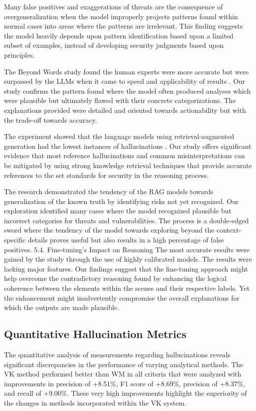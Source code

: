 \documentclass[sigconf]{acmart}
\begin{document}
Many false positives and exaggerations of threats are the consequence of overgeneralization when the model improperly projects patterns found within normal cases into areas where the patterns are irrelevant. This finding suggests the model heavily depends upon pattern identification based upon a limited subset of examples, instead of developing security judgments based upon principles.

The Beyond Words study found the human experts were more accurate but were surpassed by the LLMs when it came to speed and applicability of results \citep{esposito2024beyond}. Our study confirms the pattern found where the model often produced analyses which were plausible but ultimately flawed with their concrete categorizations. The explanations provided were detailed and oriented towards actionability but with the trade-off towards accuracy.

The experiment showed that the language models using retrieval-augmented generation had the lowest instances of hallucinations \citep{esposito2024beyond}. Our study offers significant evidence that most reference hallucinations and common misinterpretations can be mitigated by using strong knowledge retrieval techniques that provide accurate references to the set standards for security in the reasoning process.

The research demonstrated the tendency of the RAG models towards generalization of the known truth by identifying risks not yet recognized. Our exploration identified many cases where the model recognized plausible but incorrect categories for threats and vulnerabilities. The process is a double-edged sword where the tendency of the model towards exploring beyond the context-specific details proves useful but also results in a high percentage of false positives. 5.4. Fine-tuning's Impact on Reasoning The most accurate results were gained by the study through the use of highly calibrated models. The results were lacking major features. Our findings suggest that the fine-tuning approach might help overcome the contradictory reasoning found by enhancing the logical coherence between the elements within the scenes and their respective labels. Yet the enhancement might inadvertently compromise the overall explanations for which the outputs are made plausible.

\subsection{Quantitative Hallucination Metrics}
The quantitative analysis of measurements regarding hallucinations reveals significant discrepancies in the performance of varying analytical methods. The VK method performed better than WM in all criteria that were analyzed with improvements in precision of +8.51\%, F1 score of +8.69\%, precision of +8.37\%, and recall of +9.00\%. These very high improvements highlight the superiority of the changes in methods incorporated within the VK system.
\end{document}
